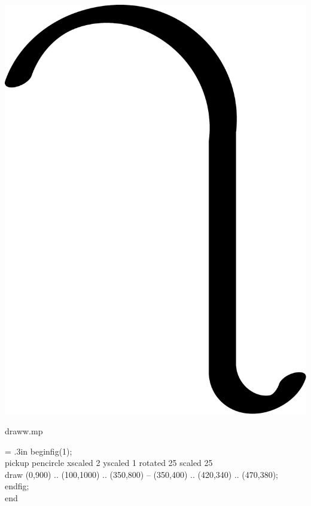 \documentclass[danish,a2paper,22pt]{scrartcl}
\begin{document}
\begin{multicols*}{3}
\begin{spacing}{0.5}
\center
\includegraphics[scale=.25]{draww-1.pdf}
\vspace{-1cm}

\flushleft
\color{White}
\romansmall
draww.mp\\
\vspace{.4cm}
\color{Black}
\typewritersmall
{\leftskip = .3in
beginfig(1);\\
pickup pencircle xscaled 2 yscaled 1 rotated 25 scaled 25\\
draw (0,900) .. (100,1000) .. (350,800) -- (350,400) .. (420,340) .. (470,380);\\
endfig;\\
end
\par}


\end{spacing}
\end{multicols*}
\end{document}
